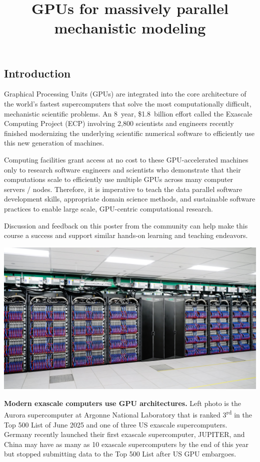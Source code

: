 \documentclass{article}
\title{GPUs for massively parallel mechanistic modeling}
\newcommand{\sectionbox}[1]{%
  \begin{tcolorbox}[sharp corners,boxrule=0pt,top=15pt,colback=fh-blue,coltext=fh-gold]%
    \section*{#1\vphantom{Yy}}%
  \end{tcolorbox}%
}
\begin{document}
\begin{multicols}{2}

  \sectionbox{Introduction}%
  \noindent
  Graphical Processing Units (GPUs) %
  are integrated into the core architecture %
  of the world's fastest supercomputers %
  that solve the most computationally difficult, %
  mechanistic scientific problems.
  An 8~year, \$1.8~billion effort %
  called the Exascale Computing Project (ECP) %
  involving 2,800 scientists and engineers %
  recently finished modernizing %
  the underlying scientific numerical software %
  to efficiently use this new generation of machines.
  \medskip

  Computing facilities grant access at no cost %
  to these GPU-accelerated%
  \supercite{%
    carter_2014,%
    beckingsale_2019,%
    reinders_2023%
  } machines %
  only to research software engineers and scientists who demonstrate that %
  their computations scale %
  to efficiently use multiple GPUs across many computer servers / nodes.
  Therefore, %
  it is imperative to teach %
  the data parallel software development skills, %
  appropriate domain science methods, and %
  sustainable software practices %
  to enable large scale, GPU-centric computational research.
  \medskip

  Discussion and feedback on this poster from the community %
  can help make this course a success and %
  support similar hands-on learning and teaching endeavors.
  \medskip

  \noindent
  \begin{minipage}[c]{.36\linewidth}
    \includegraphics[width=\linewidth]{1920x1080-Aurora hero image.jpg}
  \end{minipage}
  \begin{minipage}[c]{.62\linewidth}
    \textbf{Modern exascale computers use GPU architectures.}
    Left photo is the Aurora supercomputer at Argonne National Laboratory %
    that is ranked 3\textsuperscript{rd} in the Top 500 List of June 2025 %
    and one of three US exascale supercomputers.
    Germany recently launched their first exascale supercomputer, JUPITER, %
    and China may have as many as 10 exascale supercomputers %
    by the end of this year\supercite{dongarra_2023} %
    but stopped submitting data to the Top 500 List %
    after US GPU embargoes.
  \end{minipage}
  \vspace{\baselineskip}


\end{multicols}
\end{document}
